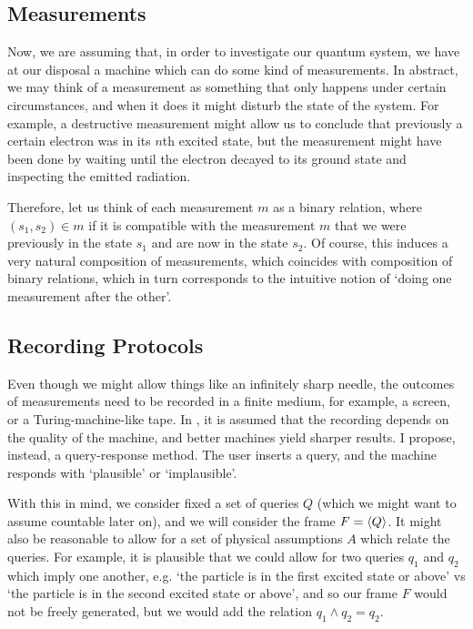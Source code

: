 \documentclass{article}
\theoremstyle{definition}
\theoremstyle{plain}
\begin{document}
\subsection{Measurements}

Now, we are assuming that, in order to investigate our quantum system, we have at our disposal a machine which can do some kind of measurements. In abstract, we may think of a measurement as something that only happens under certain circumstances, and when it does it might disturb the state of the system. For example, a destructive measurement might allow us to conclude that previously a certain electron was in its $n$th excited state, but the measurement might have been done by waiting until the electron decayed to its ground state and inspecting the emitted radiation.

Therefore, let us think of each measurement $m$ as a binary relation, where $(s_1, s_2) \in m$ if it is compatible with the measurement $m$ that we were previously in the state $s_1$ and are now in the state $s_2$. Of course, this induces a very natural composition of measurements, which coincides with composition of binary relations, which in turn corresponds to the intuitive notion of `doing one measurement after the other'.

\subsection{Recording Protocols}

Even though we might allow things like an infinitely sharp needle, the outcomes of measurements need to be recorded in a finite medium, for example, a screen, or a Turing-machine-like tape. In \cite{measurement}, it is assumed that the recording depends on the quality of the machine, and better machines yield sharper results. I propose, instead, a query-response method. The user inserts a query, and the machine responds with `plausible' or `implausible'.

With this in mind, we consider fixed a set of queries $Q$ (which we might want to assume countable later on), and we will consider the frame $F = \braket{Q}$. It might also be reasonable to allow for a set of physical assumptions $A$ which relate the queries. For example, it is plausible that we could allow for two queries $q_1$ and $q_2$ which imply one another, e.g. `the particle is in the first excited state or above' vs `the particle is in the second excited state or above', and so our frame $F$ would not be freely generated, but we would add the relation $q_1 \land q_2 = q_2$.
\end{document}
